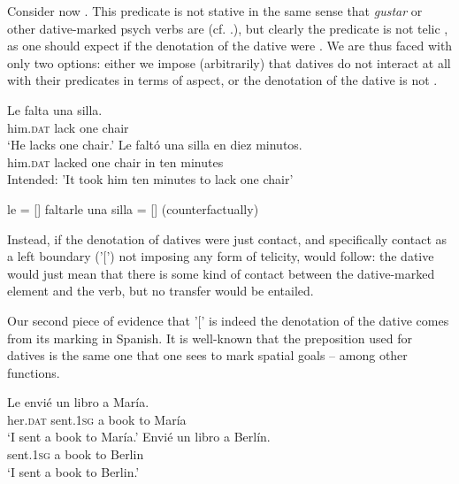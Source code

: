 \documentclass[output=paper,colorlinks,citecolor=brown,nonflat]{./langscibook}
\begin{document}
Consider now . This predicate is not stative in the same sense that \textit{gustar} or other dative-marked psych verbs are (cf. .), but clearly the predicate is not telic , as one should expect if the denotation of the dative  were . We are thus faced with only two options: either we impose (arbitrarily) that datives do not interact at all with their predicates in terms of aspect, or the denotation of the dative is not .

\ea%
    \label{ex:fabregas:19}
    \ea\label{ex:fabregas:19a}
    \gll    Le       falta   una silla.\\
            {him.}\textsc{dat}  {lack}  {one} {chair}\\
    \glt `He lacks one chair.' 
    \ex\label{ex:fabregas:19b}
    \gll    *Le           faltó     una silla  en diez minutos.\\
            him.\textsc{dat}    lacked  one chair in  ten  minutes\\
    \glt    Intended: 'It took him ten minutes to lack one chair'
    \z
\z

\ea%
    \label{ex:fabregas:20}
    \ea\label{ex:fabregas:20a}
    le              =     [{\midline}]
    \ex\label{ex:fabregas:20b}
    faltarle una silla    =    [{\midline}] (counterfactually)
    \z
\z

Instead, if the denotation of datives were just contact, and specifically contact as a left boundary ('[') not imposing any form of telicity,  would follow: the dative would just mean that there is some kind of contact between the dative-marked element and the verb, but no transfer would be entailed. 

Our second piece of evidence that '[' is indeed the denotation of the dative comes from its marking in Spanish. It is well-known that the preposition used for datives  is the same one that one sees to mark spatial goals  – among other functions.

\ea%
    \label{ex:fabregas:21}
    \ea\label{ex:fabregas:21a}
    \gll    Le     envié     un libro  a  María.\\
            {her.}\textsc{dat}  {sent.1}\textsc{sg}     {a}   {book} {to} {María}\\
    \glt `I sent a book to María.'
    \ex\label{ex:fabregas:21b}
    \gll    Envié     un libro a  Berlín.\\
            {sent.1}\textsc{sg}    {a}  {book} {to} {Berlin}\\
    \glt `I sent a book to Berlin.'
    \z
\z
\end{document}
